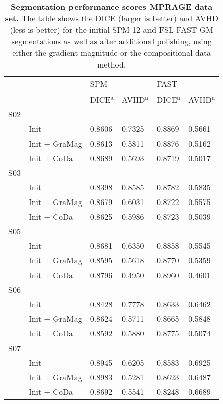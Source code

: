 \begin{table}[!ht]
\centering
\caption{
{\bf Segmentation performance scores MPRAGE data set.} The table shows the DICE (larger is better) and AVHD (less is better) for the initial SPM 12 and FSL FAST GM segmentations as well as after additional polishing, using either the gradient magnitude or the compositional data method.}
\begin{tabular}{llllll}
\hline
     &                 & \vline SPM   &     & \vline FAST   &   \\
     &                 & \vline DICE\textsuperscript{a} & AVHD\textsuperscript{a} & \vline DICE\textsuperscript{a} & AVHD\textsuperscript{a} \\
\hline
 S02 &                &            &            &             &             \\
     & Init           & 0.8606     & 0.7325     & 0.8869      & 0.5661      \\
     & Init + GraMag  & 0.8613     & 0.5811     & 0.8876      & 0.5162      \\
     & Init + CoDa    & 0.8689     & 0.5693     & 0.8719      & 0.5017      \\
 S03 &                &            &            &             &             \\
     & Init           & 0.8398     & 0.8585     & 0.8782      & 0.5835      \\
     & Init + GraMag  & 0.8679     & 0.6031     & 0.8722      & 0.5575      \\
     & Init + CoDa    & 0.8625     & 0.5986     & 0.8723      & 0.5039      \\
 S05 &                &            &            &             &             \\
     & Init           & 0.8681     & 0.6350     & 0.8858      & 0.5545      \\
     & Init + GraMag  & 0.8595     & 0.5618     & 0.8770      & 0.5359      \\
     & Init + CoDa    & 0.8796     & 0.4950     & 0.8960      & 0.4601      \\
 S06 &                &            &            &             &             \\
     & Init           & 0.8428     & 0.7778     & 0.8633      & 0.6462      \\
     & Init + GraMag  & 0.8624     & 0.5711     & 0.8665      & 0.5848      \\
     & Init + CoDa    & 0.8592     & 0.5880     & 0.8775      & 0.5074      \\
 S07 &                &            &            &             &             \\
     & Init           & 0.8945     & 0.6205     & 0.8583      & 0.6925      \\
     & Init + GraMag  & 0.8983     & 0.5281     & 0.8623      & 0.6487      \\
     & Init + CoDa    & 0.8692     & 0.5541     & 0.8248      & 0.6689      \\
\hline



\end{tabular}
\end{table}
